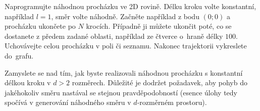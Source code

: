 \documentclass[a4paper,11pt,twoside]{article}
\begin{document}
    \begin{task}
        Naprogramujte náhodnou procházku ve 2D rovině.
        Délku kroku volte konstantní, například $l=1$, směr volte náhodně.
        Začněte například z bodu $(0;0)$ a procházku ukončete po $N$ krocích.
        Případně ji můžete ukončit poté, co se dostanete z předem zadané oblasti, například ze čtverce o~hraně délky $100$.
        Uchovávejte celou procházku v poli či seznamu. 
        Nakonec trajektorii vykreslete do~grafu.
    \end{task}

    \begin{task}
        Zamyslete se nad tím, jak byste realizovali náhodnou procházku s konstantní délkou kroku v $d>2$ rozměrech.
        Důležité je dodržet požadavek, aby pohyb do jakéhokoliv směru nastával se stejnou pravděpodobností (esence úlohy tedy spočívá v generování náhodného směru v $d$-rozměrném prostoru).
    \end{task}
\end{document}
